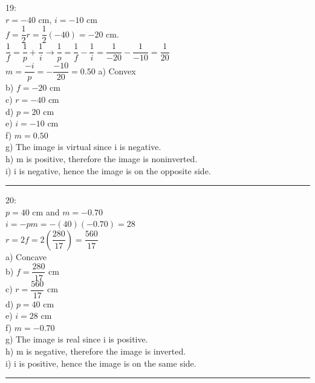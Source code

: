 \documentclass[fleqn]{article}
\begin{document}
\begin{enumerate}
    \textcolor{hwColor}{
      19: \\
      $r=-40$ cm, $i=-10$ cm\\
      $f=\dfrac{1}{2}r=\dfrac{1}{2}(-40)=-20$ cm. \\
      $\dfrac{1}{f}=\dfrac{1}{p}+\dfrac{1}{i} \rightarrow \dfrac{1}{p}=\dfrac{1}{f}-\dfrac{1}{i}=\dfrac{1}{-20}-\dfrac{1}{-10}=\dfrac{1}{20}$ \\
      $m=\dfrac{-i}{p}=-\dfrac{-10}{20}=0.50$
      a) Convex \\
      b) $f=-20$ cm \\
      c) $r=-40$ cm \\
      d) $p=20$ cm \\
      e) $i=-10$ cm \\
      f) $m=0.50$ \\
      g) The image is virtual since i is negative. \\
      h) m is positive, therefore the image is noninverted. \\
      i) i is negative, hence the image is on the opposite side. \\
    }

    \textcolor{hwColor}{
      \rule{15cm}{0.4pt}
    }

    \textcolor{hwColor}{
      20: \\
      $p=40$ cm and $m=-0.70$ \\
      $i=-pm=-(40)(-0.70)=28$ \\
      $r=2f=2(\dfrac{280}{17})=\dfrac{560}{17}$ \\
      a) Concave \\
      b) $f=\dfrac{280}{17}$ cm \\
      c) $r=\dfrac{560}{17}$ cm \\
      d) $p=40$ cm \\
      e) $i=28$ cm \\
      f) $m=-0.70$ \\
      g) The image is real since i is positive. \\
      h) m is negative, therefore the image is inverted. \\
      i) i is positive, hence the image is on the same side. \\
    }

    \textcolor{hwColor}{
      \rule{15cm}{0.4pt}
    }


\end{enumerate}
\end{document}
